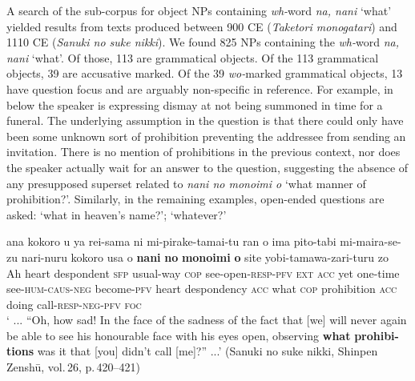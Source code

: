 \documentclass[output=paper]{LSP/langsci}
\begin{document}
A search of the sub-corpus for object NPs containing \textit{wh-}word \textit{na, nani} ‘what’ yielded results from texts produced between 900 CE (\textit{Taketori monogatari}) and 1110 CE (\textit{Sanuki no suke nikki}). We found 825 NPs containing the \textit{wh-}word \textit{na, nani} ‘what’. Of those, 113 are grammatical objects. Of the 113 grammatical objects, 39 are accusative marked. Of the 39 \textit{wo-}marked grammatical objects, 13 have question focus and are arguably non-specific in reference. For example, in  below the speaker is expressing dismay at not being summoned in time for a funeral. The underlying assumption in the question is that there could only have been some unknown sort of prohibition preventing the addressee from sending an invitation. There is no mention of prohibitions in the previous context, nor does the speaker actually wait for an answer to the question, suggesting the absence of any presupposed superset related to \textit{nani no monoimi o} ‘what manner of prohibition?’. Similarly, in the remaining examples, open-ended questions are asked: ‘what in heaven’s name?’; ‘whatever?’ 


\begin{exe}
\ex%
\label{07-fr-ex:45}
\gll ana kokoro u ya rei-sama ni mi-pirake-tamai-tu ran o ima pito-tabi mi-maira-se-zu nari-nuru kokoro usa o \textbf{nani} \textbf{no} \textbf{monoimi} \textbf{o} site yobi-tamawa-zari-turu zo\\
Ah heart despondent \textsc{sfp} usual-way \textsc{cop} see-open-\textsc{resp}-\textsc{pfv} \textsc{ext} \textsc{acc} yet one-time see-\textsc{hum}-\textsc{caus}-\textsc{neg} become-\textsc{pfv} heart despondency \textsc{acc}  what  \textsc{cop} prohibition \textsc{acc}  doing call-\textsc{resp}-\textsc{neg}-\textsc{pfv} \textsc{foc}\\
\glt ‘ ... “Oh, how sad! In the face of the sadness of the fact that [we] will never again be able to see his honourable face with his eyes open, observing \textbf{what} \textbf{prohibi-} \textbf{tions} was it that [you] didn't call [me]?” ...’  (Sanuki no suke nikki, Shinpen Zenshū, vol.\,26, p.\,420–421)
\end{exe}
\end{document}
